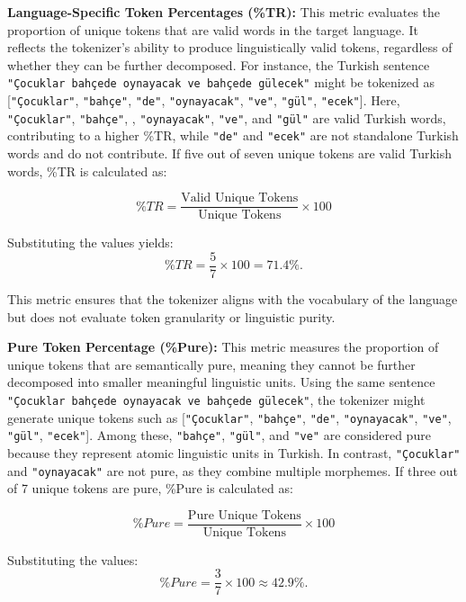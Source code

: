 \textbf{Language-Specific Token Percentages (\%TR):}  
This metric evaluates the proportion of unique tokens that are valid words in the target language. It reflects the tokenizer's ability to produce linguistically valid tokens, regardless of whether they can be further decomposed. For instance, the Turkish sentence \texttt{"Çocuklar bahçede oynayacak ve bahçede gülecek"} might be tokenized as [\texttt{"Çocuklar"}, \texttt{"bahçe"}, \texttt{"de"}, \texttt{"oynayacak"}, \texttt{"ve"}, \texttt{"gül"}, \texttt{"ecek"}]. Here, \texttt{"Çocuklar"}, \texttt{"bahçe"}, , \texttt{"oynayacak"}, \texttt{"ve"}, and \texttt{"gül"} are valid Turkish words, contributing to a higher \%TR, while \texttt{"de"} and \texttt{"ecek"} are not standalone Turkish words and do not contribute. If five out of seven unique tokens are valid Turkish words, \%TR is calculated as:

\begin{equation}
\%TR = \frac{\text{Valid Unique Tokens}}{\text{Unique Tokens}} \times 100
\label{eq:tr_percentage}
\end{equation}

Substituting the values yields:
\[
\%TR = \frac{5}{7} \times 100 = 71.4\%.
\]

This metric ensures that the tokenizer aligns with the vocabulary of the language but does not evaluate token granularity or linguistic purity.

\textbf{Pure Token Percentage (\%Pure):}  
This metric measures the proportion of unique tokens that are semantically pure, meaning they cannot be further decomposed into smaller meaningful linguistic units. Using the same sentence \texttt{"Çocuklar bahçede oynayacak ve bahçede gülecek"}, the tokenizer might generate unique tokens such as [\texttt{"Çocuklar"}, \texttt{"bahçe"}, \texttt{"de"}, \texttt{"oynayacak"}, \texttt{"ve"}, \texttt{"gül"}, \texttt{"ecek"}]. Among these, \texttt{"bahçe"}, \texttt{"gül"}, and \texttt{"ve"} are considered pure because they represent atomic linguistic units in Turkish. In contrast, \texttt{"Çocuklar"} and \texttt{"oynayacak"} are not pure, as they combine multiple morphemes. If three out of 7 unique tokens are pure, \%Pure is calculated as:

\begin{equation}
\%Pure = \frac{\text{Pure Unique Tokens}}{\text{Unique Tokens}} \times 100
\label{eq:pure_percentage}
\end{equation}

Substituting the values:
\[
\%Pure = \frac{3}{7} \times 100 \approx 42.9\%.
\]

